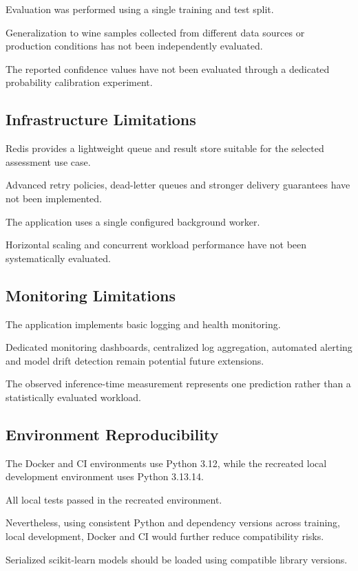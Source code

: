 \documentclass[11pt,a4paper]{article}
\begin{document}
Evaluation was performed using a single
training and test split.

Generalization to wine samples collected from
different data sources or production conditions
has not been independently evaluated.

The reported confidence values have not been
evaluated through a dedicated probability
calibration experiment.

\subsection{Infrastructure Limitations}

Redis provides a lightweight queue and result
store suitable for the selected assessment use
case.

Advanced retry policies, dead-letter queues
and stronger delivery guarantees have not been
implemented.

The application uses a single configured
background worker.

Horizontal scaling and concurrent workload
performance have not been systematically
evaluated.

\subsection{Monitoring Limitations}

The application implements basic logging and
health monitoring.

Dedicated monitoring dashboards, centralized
log aggregation, automated alerting and model
drift detection remain potential future
extensions.

The observed inference-time measurement
represents one prediction rather than a
statistically evaluated workload.

\subsection{Environment Reproducibility}

The Docker and CI environments use Python 3.12,
while the recreated local development environment
uses Python 3.13.14.

All local tests passed in the recreated
environment.

Nevertheless, using consistent Python and
dependency versions across training, local
development, Docker and CI would further
reduce compatibility risks.

Serialized scikit-learn models should be loaded
using compatible library versions.
\end{document}
